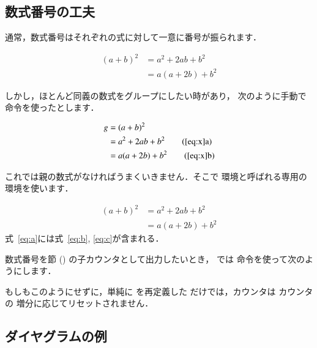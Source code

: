 \subsection{数式番号の工夫}

通常，数式番号はそれぞれの式に対して一意に番号が振られます．
\begin{InOut}
\begin{align}
(a+b)^2 &= a^2+2ab+b^2 \\
        &= a(a+2b)+b^2  
\end{align}
\end{InOut}

しかし，ほとんど同義の数式をグループにしたい時があり，
次のように手動で  命令を使ったとします．
\begin{InOut}
\begin{align}
g &= (a+b)^2     \label{eq:x}\\
  &= a^2+2ab+b^2 \tag{\ref{eq:x}a}\\
  &= a(a+2b)+b^2 \tag{\ref{eq:x}b}
\end{align} 
\end{InOut}
これでは親の数式がなければうまくいきません．そこで 
環境と呼ばれる専用の環境を使います．
\begin{InOut}
\begin{subequations}\label{eq:a}
 \begin{align}
 (a+b)^2 &= a^2+2ab+b^2\label{eq:b}\\
         &= a(a+2b)+b^2\label{eq:c}
 \end{align} 
\end{subequations} 
式~\eqref{eq:a}には式~\eqref{eq:b},
\eqref{eq:c}が含まれる．
\end{InOut}

\begin{Trick}
数式番号を節 () の子カウンタとして出力したいとき，
\AmSLaTeX では  命令を使って次のようにします．

\begin{InTeX}
\end{InTeX}

もしもこのようにせずに，単純に  を再定義した
だけでは，カウンタは カウンタの
増分に応じてリセットされません．
\end{Trick}


\subsection{ダイヤグラムの例}
%

